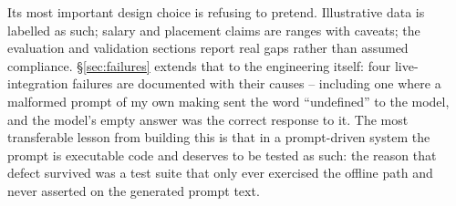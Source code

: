 \documentclass[11pt]{article}
\begin{document}
Its most important design choice is refusing to pretend. Illustrative data is labelled as such; salary and placement claims are ranges with caveats; the evaluation and validation sections report real gaps rather than assumed compliance. \S\ref{sec:failures} extends that to the engineering itself: four live-integration failures are documented with their causes -- including one where a malformed prompt of my own making sent the word ``undefined'' to the model, and the model's empty answer was the correct response to it. The most transferable lesson from building this is that in a prompt-driven system the prompt is executable code and deserves to be tested as such: the reason that defect survived was a test suite that only ever exercised the offline path and never asserted on the generated prompt text.
\end{document}
